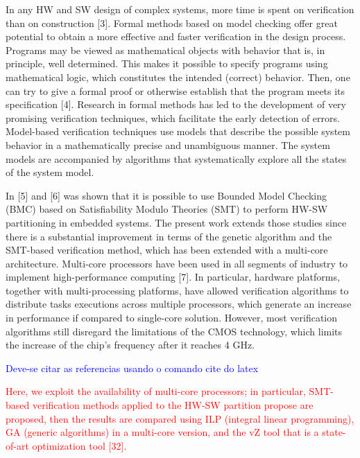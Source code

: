 In any HW and SW design of complex systems, more time is spent on verification than on construction [3]. Formal methods based on model checking offer great potential to obtain a more effective and faster verification in the design process. Programs may be viewed as mathematical objects with behavior that is, in principle, well determined. This makes it possible to specify programs using mathematical logic, which constitutes the intended (correct) behavior. Then, one can try to give a formal proof or otherwise establish that the program meets its specification [4]. Research in formal methods has led to the development of very promising verification techniques, which facilitate the early detection of errors. Model-based verification techniques use models that describe the possible system behavior in a mathematically precise and unambiguous manner. The system models are accompanied by algorithms that systematically explore all the states of the system model.

In [5] and [6] was shown that it is possible to use Bounded Model Checking (BMC) based on Satisfiability Modulo Theories (SMT) to perform HW-SW partitioning in embedded systems. The present work extends those studies since there is a substantial improvement in terms of the genetic algorithm and the SMT-based verification method, which has been extended with a multi-core architecture. Multi-core processors have been used in all segments of industry to implement high-performance computing [7]. In particular, hardware platforms, together with multi-processing platforms, have allowed verification algorithms to distribute tasks executions across multiple processors, which generate an increase in performance if compared to single-core solution. However, most verification algorithms still disregard the limitations of the CMOS technology, which limits the increase of the chip’s frequency after it reaches 4 GHz.

\textcolor{blue}{Deve-se citar as referencias usando o comando cite do latex}

\textcolor{Red}{Here, we exploit the availability of multi-core processors; in particular, SMT-based verification methods applied to the HW-SW partition propose are proposed, then the results are compared using ILP (integral linear programming), GA (generic algorithms) in a multi-core version, and the vZ tool that is a state-of-art optimization tool [32].} 

